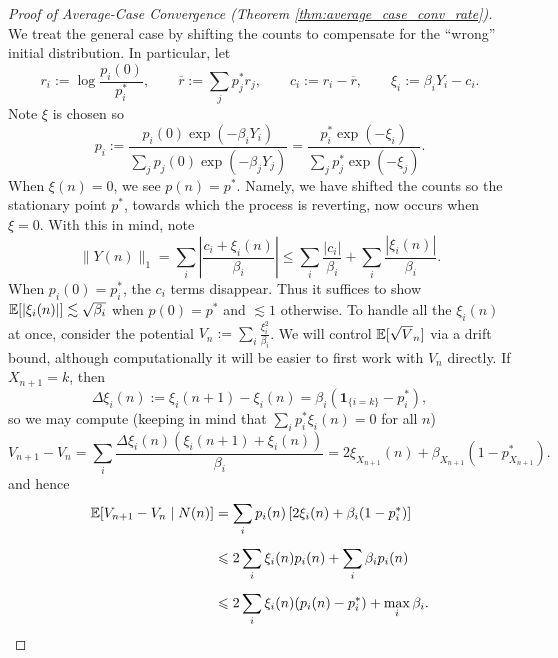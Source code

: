\begin{proof}[Proof of Average-Case Convergence (Theorem \ref{thm:average_case_conv_rate})]
    We treat the general case by shifting the counts to compensate for the ``wrong'' initial distribution. In particular, let
        $$r_i := \log \frac{p_i(0)}{p_i^*}, \qquad \overline r := \sum_j p_j^* r_j, \qquad c_i := r_i - \overline r, \qquad \xi_i := \beta_i Y_i - c_i.$$
    Note $\xi$ is chosen so
        \[p_i := \frac{p_i(0)\exp(-\beta_i Y_i)}{\sum_j p_j(0)\exp(-\beta_j Y_j)} = \frac{p_i^* \exp(-\xi_i)}{\sum_j p_j^* \exp(-\xi_j)}.\]
    \noindent When $\xi(n) = 0$, we see $p(n) = p^*$. Namely, we have shifted the counts so the stationary 
    point $p^*$, towards which the process is reverting, now occurs when $\xi = 0$.  With this in mind, note
        $$\| Y(n) \|_1 = \sum_i \left| \frac{c_i + \xi_i(n)}{\beta_i}\right| \leq \sum_i \frac{|c_i|}{\beta_i} + \sum_i \frac{|\xi_i(n)|}{\beta_i}.$$
    When $p_i(0) = p_i^*$, the $c_i$ terms disappear. Thus it suffices to show $\mathbb{E}[|\xi_i(n)|] \lesssim \sqrt{\beta_i}$ when $p(0) = p^*$ and $\lesssim 1$ otherwise. 
    To handle all the $\xi_i(n)$ at once, consider the potential $V_n := \sum_i \frac{\xi_i^2}{\beta_i}$. We will control $\mathbb{E}[\sqrt V_n]$ via a drift bound, although computationally
    it will be easier to first work with $V_n$ directly. If $X_{n+1} = k$, then
    $$\Delta \xi_i(n) := \xi_i(n+1) - \xi_i(n) = \beta_i( \mathbf 1_{\{i = k\}} - p_i^*),$$
    so we may compute (keeping in mind that $\sum_i p_i^* \xi_i(n) = 0$ for all $n$)
        \[V_{n+1} - V_n =\sum_{i} \frac{\Delta \xi_i(n) \left(\xi_i(n+1) + \xi_i(n)\right)}{\beta_i} = 2\xi_{X_{n+1}}(n) + \beta_{X_{n+1}}(1-p_{X_{n+1}}^*).\]
    \noindent and hence
    \begin{align*}
        \mathbb{E}[V_{n+1} - V_n \mid N(n)] &= \sum_{i} p_i(n) \left[2\xi_i(n) + \beta_i(1-p_i^*)\right]\\[5pt]
        & \leqslant 2\sum_i  \xi_i(n) p_i(n) + \sum_i \beta_i p_i(n)\\[5pt]
        & \leqslant 2\sum_i \xi_i(n) (p_i(n) - p_i^*) + \max_i \beta_i.
    \end{align*}


\end{proof}
